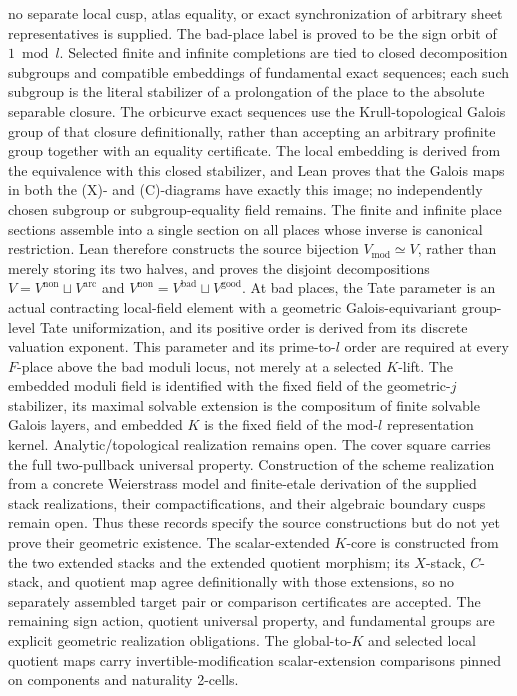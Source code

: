 \begin{definition}
  no separate local cusp, atlas equality, or exact synchronization of arbitrary
  sheet representatives is supplied.  The bad-place label is proved to be the
  sign orbit of \(1\bmod l\).  Selected finite and infinite
  completions are tied to closed decomposition subgroups and compatible
  embeddings of fundamental exact sequences; each such subgroup is the
  literal stabilizer of a prolongation of the place to the absolute separable
  closure.  The orbicurve exact sequences use the Krull-topological Galois
  group of that closure definitionally, rather than accepting an arbitrary
  profinite group together with an equality certificate.  The local embedding
  is derived from the equivalence with this closed stabilizer, and Lean proves
  that the Galois maps in both the (X)- and (C)-diagrams have exactly this
  image; no independently chosen subgroup or subgroup-equality field remains.
  The finite and infinite place sections assemble into a single section on all
  places whose inverse is canonical restriction.  Lean therefore constructs
  the source bijection \(V_{\mathrm{mod}}\simeq V\), rather than merely storing
  its two halves, and proves the disjoint decompositions
  \(V=V^{\mathrm{non}}\sqcup V^{\mathrm{arc}}\) and
  \(V^{\mathrm{non}}=V^{\mathrm{bad}}\sqcup V^{\mathrm{good}}\).
  At bad places, the Tate
  parameter is an actual contracting local-field element with a geometric
  Galois-equivariant group-level Tate uniformization, and its positive order
  is derived from its discrete valuation exponent.  This parameter and its
  prime-to-\(l\) order are required at every \(F\)-place above the bad moduli
  locus, not merely at a selected \(K\)-lift.  The embedded moduli field is
  identified with the fixed field of the geometric-\(j\) stabilizer, its
  maximal solvable extension is the compositum of finite solvable Galois
  layers, and embedded \(K\) is the fixed field of the mod-\(l\)
  representation kernel.  Analytic/topological
  realization remains open.  The cover square carries the
  full two-pullback universal property.  Construction of the scheme realization
  from a concrete Weierstrass model and finite-etale derivation of the supplied
  stack realizations, their compactifications, and their algebraic boundary
  cusps remain open.  Thus these records specify the source constructions but
  do not yet prove their geometric existence.  The
  scalar-extended \(K\)-core is constructed from the two extended stacks and
  the extended quotient morphism; its \(X\)-stack, \(C\)-stack, and quotient
  map agree definitionally with those extensions, so no separately assembled
  target pair or comparison certificates are accepted.  The remaining sign
  action, quotient universal property, and fundamental groups are explicit
  geometric realization obligations.  The global-to-\(K\) and selected local
  quotient maps carry invertible-modification scalar-extension comparisons
  pinned on components and naturality 2-cells.
\end{definition}

